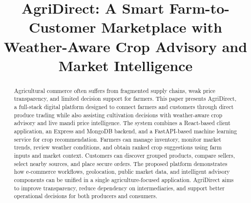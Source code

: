 \documentclass[conference]{IEEEtran}
\begin{document}
\title{AgriDirect: A Smart Farm-to-Customer Marketplace with Weather-Aware Crop Advisory and Market Intelligence}

\author{
\and
{}
\and
{}
\and
{}
\and
{}
}

\maketitle

\begin{abstract}
Agricultural commerce often suffers from fragmented supply chains, weak price transparency, and limited decision support for farmers. This paper presents AgriDirect, a full-stack digital platform designed to connect farmers and customers through direct produce trading while also assisting cultivation decisions with weather-aware crop advisory and live mandi price intelligence. The system combines a React-based client application, an Express and MongoDB backend, and a FastAPI-based machine learning service for crop recommendation. Farmers can manage inventory, monitor market trends, review weather conditions, and obtain ranked crop suggestions using farm inputs and market context. Customers can discover grouped products, compare sellers, select nearby sources, and place secure orders. The proposed platform demonstrates how e-commerce workflows, geolocation, public market data, and intelligent advisory components can be unified in a single agriculture-focused application. AgriDirect aims to improve transparency, reduce dependency on intermediaries, and support better operational decisions for both producers and consumers.
\end{abstract}
\end{document}

